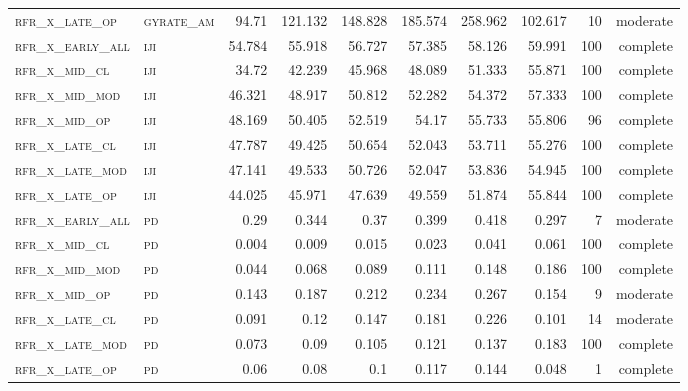 \begin{landscape}
\begin{center}
\begin{footnotesize}
\begin{longtable}{llrrrrr|rrr}
\textsc{rfr\_x\_late\_op  } & \textsc{gyrate\_am}   & 94.71   & 121.132 & 148.828  & 185.574  & 258.962  & 102.617 & 10  & moderate \\
\textsc{rfr\_x\_early\_all} & \textsc{iji       }   & 54.784  & 55.918  & 56.727   & 57.385   & 58.126   & 59.991  & 100 & complete \\
\textsc{rfr\_x\_mid\_cl   } & \textsc{iji       }   & 34.72   & 42.239  & 45.968   & 48.089   & 51.333   & 55.871  & 100 & complete \\
\textsc{rfr\_x\_mid\_mod  } & \textsc{iji       }   & 46.321  & 48.917  & 50.812   & 52.282   & 54.372   & 57.333  & 100 & complete \\
\textsc{rfr\_x\_mid\_op   } & \textsc{iji       }   & 48.169  & 50.405  & 52.519   & 54.17    & 55.733   & 55.806  & 96  & complete \\
\textsc{rfr\_x\_late\_cl  } & \textsc{iji       }   & 47.787  & 49.425  & 50.654   & 52.043   & 53.711   & 55.276  & 100 & complete \\
\textsc{rfr\_x\_late\_mod } & \textsc{iji       }   & 47.141  & 49.533  & 50.726   & 52.047   & 53.836   & 54.945  & 100 & complete \\
\textsc{rfr\_x\_late\_op  } & \textsc{iji       }   & 44.025  & 45.971  & 47.639   & 49.559   & 51.874   & 55.844  & 100 & complete \\
\textsc{rfr\_x\_early\_all} & \textsc{pd        }   & 0.29    & 0.344   & 0.37     & 0.399    & 0.418    & 0.297   & 7   & moderate \\
\textsc{rfr\_x\_mid\_cl   } & \textsc{pd        }   & 0.004   & 0.009   & 0.015    & 0.023    & 0.041    & 0.061   & 100 & complete \\
\textsc{rfr\_x\_mid\_mod  } & \textsc{pd        }   & 0.044   & 0.068   & 0.089    & 0.111    & 0.148    & 0.186   & 100 & complete \\
\textsc{rfr\_x\_mid\_op   } & \textsc{pd        }   & 0.143   & 0.187   & 0.212    & 0.234    & 0.267    & 0.154   & 9   & moderate \\
\textsc{rfr\_x\_late\_cl  } & \textsc{pd        }   & 0.091   & 0.12    & 0.147    & 0.181    & 0.226    & 0.101   & 14  & moderate \\
\textsc{rfr\_x\_late\_mod } & \textsc{pd        }   & 0.073   & 0.09    & 0.105    & 0.121    & 0.137    & 0.183   & 100 & complete \\
\textsc{rfr\_x\_late\_op  } & \textsc{pd        }   & 0.06    & 0.08    & 0.1      & 0.117    & 0.144    & 0.048   & 1   & complete \\

\end{longtable}
\end{footnotesize}
\end{center}
\end{landscape}
